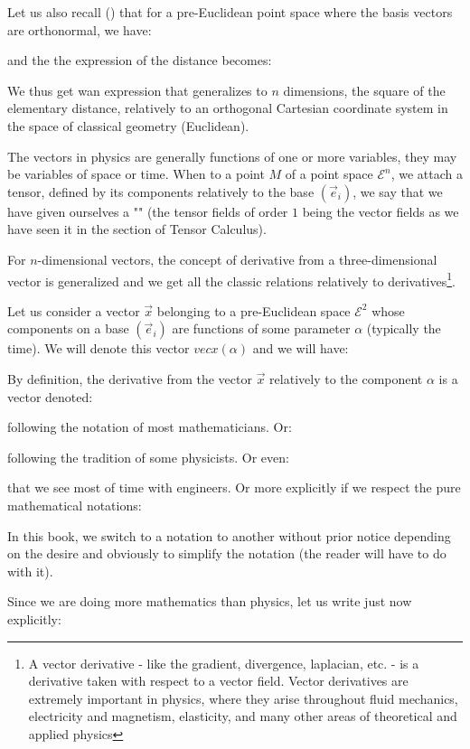 	Let us also recall () that for a pre-Euclidean point space where the basis vectors are orthonormal, we have:
	
	and the the expression of the distance becomes:
	
	We thus get wan expression that generalizes to $n$ dimensions, the square of the elementary distance, relatively to an orthogonal Cartesian coordinate system in the space of classical geometry (Euclidean).
	
	The vectors in physics are generally functions of one or more variables, they may be variables of space or time. When to a point $M$ of a point space $\mathcal{E}^n$, we attach a tensor, defined by its components relatively to the base $(\vec{e}_i)$, we say that we have given ourselves a "" (the tensor fields of order $1$ being the vector fields as we have seen it in the section of Tensor Calculus).
	
	For $n$-dimensional vectors, the concept of derivative from a three-dimensional vector is generalized and we get all the classic relations relatively to derivatives\footnote{A vector derivative - like the gradient, divergence, laplacian, etc. - is a derivative taken with respect to a vector field. Vector derivatives are extremely important in physics, where they arise throughout fluid mechanics, electricity and magnetism, elasticity, and many other areas of theoretical and applied physics}.

	Let us consider a vector $\vec{x}$ belonging to a pre-Euclidean space $\mathcal{E}^2$ whose components on a base $(\vec{e}_i)$ are functions of some parameter $\alpha$ (typically the time). We will denote this vector $vec{x}(\alpha)$ and we will have:
	
	By definition, the derivative from the vector $\vec{x}$ relatively to the component $\alpha$  is a vector denoted:
	
	following the notation of most mathematicians. Or:
	
	following the tradition of some physicists. Or even:
	
	that we see most of time with engineers. Or more explicitly if we respect the pure mathematical notations:
	
	In this book, we switch to a notation to another without prior notice depending on the desire and obviously to simplify the notation (the reader will have to do with it).

	Since we are doing more mathematics than physics, let us write just now explicitly:
	

